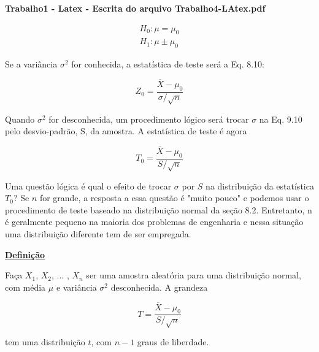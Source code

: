 \documentclass[a4paper,12pt]{article} %
\begin{document}
	\newpage
	
	\begin{center} %
		{\Large \bf Trabalho1 - Latex - Escrita do arquivo Trabalho4-LAtex.pdf} %
		\vspace{2mm}
		
	\end{center}  

	\vspace{0.4cm}
	
	\begin{align*}
			H_0: \mu = \mu_0 \\
			H_1: \mu \pm \mu_0
	\end{align*}

	Se a variância $\sigma^2$ for conhecida, a estatística de teste será a Eq. 8.10:
	
	\begin{equation*}
		Z_0 = \frac{\overline{X} - \mu_0}{\sigma / \sqrt{n}}
	\end{equation*}

	Quando $\sigma^2$ for desconhecida, um procedimento lógico será trocar $\sigma$ na Eq. 9.10 pelo desvio-padrão, S, da amostra. A estatística de teste é agora
	
	\begin{blockquote}
		\begin{equation}
			\tag{8.39}
			T_0 = \frac{\overline{X} - \mu_0}{S / \sqrt{n}}
		\end{equation}  
	\end{blockquote}
	
	Uma questão lógica é qual o efeito de trocar $\sigma$ por $S$ na distribuição da estatística $T_0$? Se $n$ for grande, a resposta a essa questão é "muito pouco" e podemos usar o procedimento de teste baseado na distribuição normal da seção 8.2. Entretanto, n é geralmente pequeno na maioria dos problemas de engenharia e nessa situação uma distribuição diferente tem de ser empregada.
	
	\begin{blockquote}
		\begin{center}
			\textbf{\underline{Definição} } 
		\end{center}
		
		Faça $ X_1 $, $ X_2 $, ... , $ X_n $ ser uma amostra aleatória para uma distribuição normal, com média $\mu$  e variância $\sigma^2$ desconhecida. A grandeza
		
		\begin{equation*}
			T = \frac{\overline{X} - \mu_0}{S / \sqrt{n}}
		\end{equation*}
		
		
		tem uma distribuição $ t $, com $ n-1 $ graus de liberdade.
	\end{blockquote}
\end{document}
